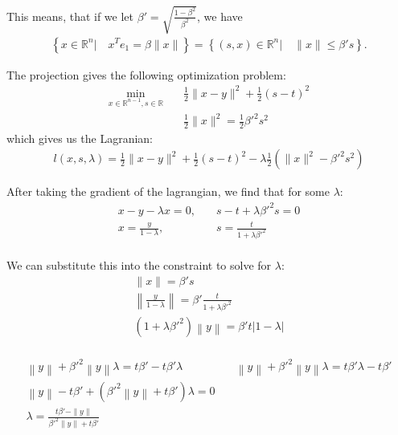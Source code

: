 \documentclass{article}
\theoremstyle{case}
\begin{document}
This means, that if we let $\beta' = \sqrt{\frac{1 - \beta^2}{\beta^2}}$, we have
\begin{align*}
\left\{ x \in \mathbb R^n | \quad x^Te_1 = \beta \|x\| \right\} = \left \{(s, x)\in \mathbb R^n | \quad\|x\| \le \beta' s \right\}.
\end{align*}

The projection gives the following optimization problem:
\begin{align*}
\min_{x \in \mathbb R^{n-1}, s \in \mathbb R} & \quad \frac 1 2 \|x - y\|^2 + \frac 1 2 (s - t)^2 \\
			& \quad \frac 1 2 \|x\|^2 = \frac 1 2 {\beta'}^2 s^2
\end{align*}
which gives us the Lagranian:
\begin{align*}
l(x, s, \lambda) = \frac 1 2 \|x - y \|^2 + \frac 1 2 \left(s - t\right)^2 - \lambda \frac 1 2 \left(\|x\|^2 - {\beta'}^2 s^2\right)
\end{align*}

After taking the gradient of the lagrangian, we find that for some $\lambda$:
\begin{align*}
x - y - \lambda x = 0, & \quad s - t + \lambda {\beta'}^2 s = 0 \\
x = \frac {y}{1 - \lambda}, & \quad s = \frac {t}{1 + \lambda {\beta'}^2 } \\
\end{align*}

We can substitute this into the constraint to solve for $\lambda$:
\begin{align*}
\|x\| = {\beta'} s \\
\left\|\frac {y}{1 - \lambda}\right\| = {\beta'} \frac {t}{1 + \lambda {\beta'}^2 } \\
\left(1 + \lambda {\beta'}^2\right) \left\|y\right\| = {\beta'}  {t} \left|1 - \lambda\right|\\
\end{align*}

\begin{align*}
\left\|y\right\| + {\beta'}^2\left\|y\right\|\lambda = t {\beta'} - t {\beta'} \lambda          &   \quad
\left\|y\right\| + {\beta'}^2\left\|y\right\|\lambda = t {\beta'} \lambda - t {\beta'}					\\
\left\|y\right\|-t {\beta'} +\left( {\beta'}^2\left\|y\right\| + t {\beta'} \right)\lambda = 0  &		\\
\lambda = \frac{t {\beta'} - \|y\|}{{\beta'}^2\|y\| + t {\beta'}}                               &		\\
\end{align*}
\end{document}
